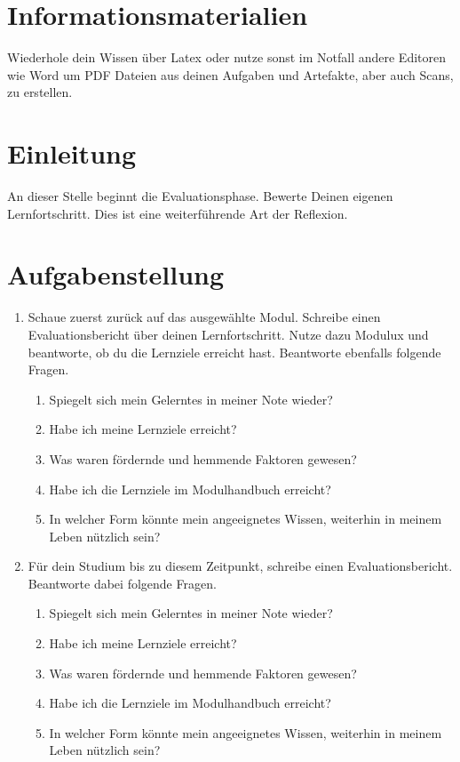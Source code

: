 \documentclass[a4paper,oneside]{scrarticle}
\begin{document}
	\pagebreak 
	
	\section*{Informationsmaterialien}
	
	Wiederhole dein Wissen über Latex oder nutze sonst im Notfall andere Editoren wie Word um PDF Dateien aus deinen Aufgaben und Artefakte, aber auch Scans, zu erstellen.
	
	
	
	
	\pagebreak
	
	\section*{Einleitung}
	An dieser Stelle beginnt die Evaluationsphase. Bewerte Deinen eigenen Lernfortschritt. Dies ist eine weiterführende Art der Reflexion. 
	
	\section*{Aufgabenstellung}

	\begin{enumerate}
		\item Schaue zuerst zurück auf das ausgewählte Modul. Schreibe einen Evaluationsbericht über deinen Lernfortschritt. Nutze dazu Modulux und beantworte, ob du die Lernziele erreicht hast. Beantworte ebenfalls folgende Fragen.
		\begin{enumerate}
			\item Spiegelt sich mein Gelerntes in meiner Note wieder?
			\item Habe ich meine Lernziele erreicht?
			\item Was waren fördernde und hemmende Faktoren gewesen?
			\item Habe ich die Lernziele im Modulhandbuch erreicht?
			\item In welcher Form könnte mein angeeignetes Wissen, weiterhin in meinem Leben nützlich sein?
		\end{enumerate}
		\item Für dein Studium bis zu diesem Zeitpunkt, schreibe einen Evaluationsbericht. Beantworte dabei folgende Fragen.
		\begin{enumerate}
			\item Spiegelt sich mein Gelerntes in meiner Note wieder?
			\item Habe ich meine Lernziele erreicht?
			\item Was waren fördernde und hemmende Faktoren gewesen?
			\item Habe ich die Lernziele im Modulhandbuch erreicht?
			\item In welcher Form könnte mein angeeignetes Wissen, weiterhin in meinem Leben nützlich sein?
		\end{enumerate}

	\end{enumerate}
\end{document}
